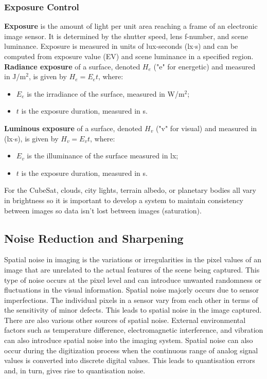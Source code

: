\subsubsection{Exposure Control}
\textbf{Exposure} is the amount of light per unit area reaching a frame of an electronic image sensor. It is determined by the shutter speed, lens f-number, and scene luminance. Exposure is measured in units of lux-seconds (lx$\cdot$s) and can be computed from exposure value (EV) and scene luminance in a specified region.
\nl
\textbf{Radiance exposure} of a surface, denoted $H_e$ ("e" for energetic) and measured in J/m$^2$, is given by $H_e=E_et$, where:
\begin{itemize}
    \item $E_e$ is the irradiance of the surface, measured in W/m$^2$;
    \item $t$ is the exposure duration, measured in s.
\end{itemize}
\textbf{Luminous exposure} of a surface, denoted $H_v$ ("v" for visual) and measured in (lx$\cdot$s), is given by $H_v=E_vt$, where:
\begin{itemize}
    \item $E_v$ is the illuminance of the surface measured in lx;
    \item $t$ is the exposure duration, measured in s.
\end{itemize}
For the CubeSat, clouds, city lights, terrain albedo, or planetary bodies all vary in brightness so it is important to develop a system to maintain consistency between images so data isn't lost between images (saturation).

\subsection{Noise Reduction and Sharpening}
Spatial noise in imaging is the variations or irregularities in the pixel values of an image that are unrelated to the actual features of the scene being captured. This type of noise occurs at the pixel level and can introduce unwanted randomness or fluctuations in the visual information.
\nl
Spatial noise majorly occurs due to sensor imperfections. The individual pixels in a sensor vary from each other in terms of the sensitivity of minor defects. This leads to spatial noise in the image captured.
\nl
There are also various other sources of spatial noise. External environmental factors such as temperature difference, electromagnetic interference, and vibration can also introduce spatial noise into the imaging system. Spatial noise can also occur during the digitization process when the continuous range of analog signal values is converted into discrete digital values. This leads to quantisation errors and, in turn, gives rise to quantisation noise.
